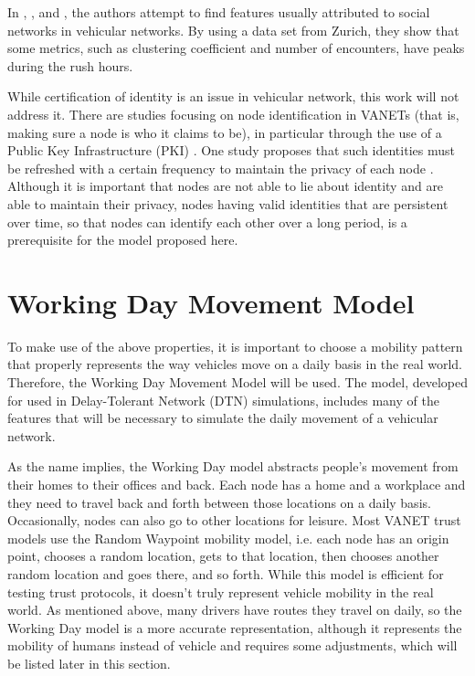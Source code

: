 In \cite{da2013effective}, \cite{cunha2014vehicular}, and \cite{cunha2014possible}, the authors attempt to find features usually attributed to social networks in vehicular networks.
By using a data set from Zurich, they show that some metrics, such as clustering coefficient and number of encounters, have peaks during the rush hours.


While certification of identity is an issue in vehicular network, this work will not address it.
There are studies focusing on node identification in VANETs (that is, making sure a node is who it claims to be), in particular through the use of a Public Key Infrastructure (PKI) \cite{wasef2010complementing} 
\cite{kumar2015intelligent}.
One study proposes that such identities must be refreshed with a certain frequency to maintain the privacy of each node \cite{golle2004detecting}.
Although it is important that nodes are not able to lie about identity and are able to maintain their privacy, nodes having valid identities that are persistent over time, so that nodes can identify each other over a long period, is a prerequisite for the model proposed here.

\section{Working Day Movement Model}
\label{section:workingday}

To make use of the above properties, it is important to choose a mobility pattern that properly represents the way vehicles move on a daily basis in the real world.
Therefore, the Working Day Movement Model \cite{ekman2008working} will be used.
The model, developed for used in Delay-Tolerant Network (DTN) simulations, includes many of the features that will be necessary to simulate the daily movement of a vehicular network.

As the name implies, the Working Day model abstracts people's movement from their homes to their offices and back.
Each node has a home and a workplace and they need to travel back and forth between those locations on a daily basis.
Occasionally, nodes can also go to other locations for leisure.
Most VANET trust models use the Random Waypoint mobility model, i.e. each node has an origin point, chooses a random location, gets to that location, then chooses another random location and goes there, and so forth.
While this model is efficient for testing trust protocols, it doesn't truly represent vehicle mobility in the real world.
As mentioned above, many drivers have routes they travel on daily, so the Working Day model is a more accurate representation, although it represents the mobility of humans instead of vehicle and requires some adjustments, which will be listed later in this section.

